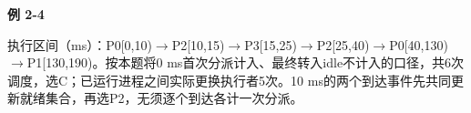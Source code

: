 {\color{ink}\bfseries 例 2-4}\par\vspace{1bp}执行区间（ms）：P0[0,\allowbreak{}10)\(\to \)P2[10,\allowbreak{}15)\(\to \)P3[15,\allowbreak{}25)\(\to \)P2[25,\allowbreak{}40)\(\to \)P0[40,\allowbreak{}130)\(\to \)P1[130,\allowbreak{}190)。按本题将0 ms首次分派计入、最终转入idle不计入的口径，共6次调度，选C；已运行进程之间实际更换执行者5次。10 ms的两个到达事件先共同更新就绪集合，再选P2，无须逐个到达各计一次分派。
